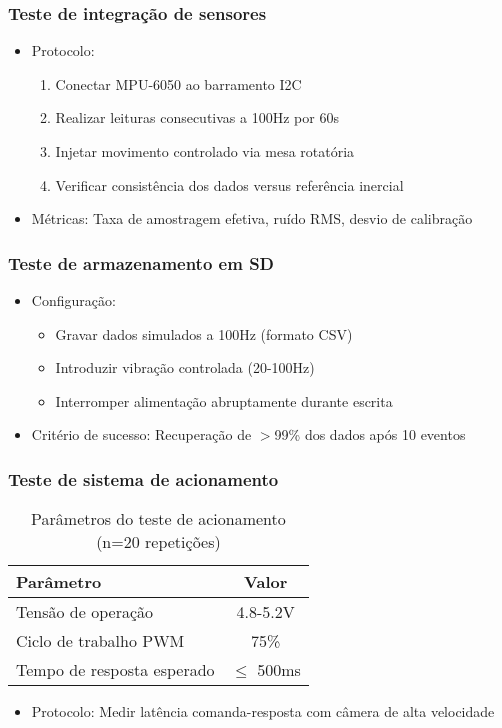 \subsubsection{Teste de integração de sensores}
\begin{itemize}
    \item Protocolo:
    \begin{enumerate}
        \item Conectar MPU-6050 ao barramento I2C
        \item Realizar leituras consecutivas a 100Hz por 60s
        \item Injetar movimento controlado via mesa rotatória
        \item Verificar consistência dos dados versus referência inercial
    \end{enumerate}
    \item Métricas: Taxa de amostragem efetiva, ruído RMS, desvio de calibração
\end{itemize}

\subsubsection{Teste de armazenamento em SD}
\begin{itemize}
    \item Configuração:
    \begin{itemize}
        \item Gravar dados simulados a 100Hz (formato CSV)
        \item Introduzir vibração controlada (20-100Hz)
        \item Interromper alimentação abruptamente durante escrita
    \end{itemize}
    \item Critério de sucesso: Recuperação de $>$99\% dos dados após 10 eventos
\end{itemize}

\subsubsection{Teste de sistema de acionamento}
\begin{table}[H]
    \centering
    \caption{Parâmetros do teste de acionamento (n=20 repetições)}
    \begin{tabular}{|l|c|}
        \hline
        Parâmetro & Valor \\
        \hline
        Tensão de operação & 4.8-5.2V \\
        Ciclo de trabalho PWM & 75\% \\
        Tempo de resposta esperado & $\leq$ 500ms \\
        \hline
    \end{tabular}
\end{table}
\begin{itemize}
    \item Protocolo: Medir latência comanda-resposta com câmera de alta velocidade
\end{itemize}

